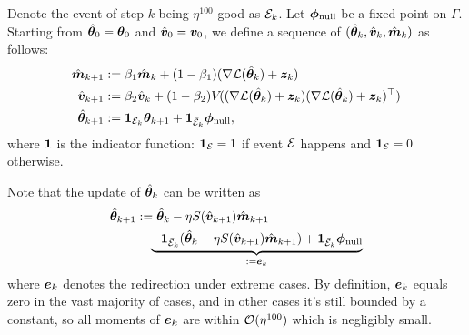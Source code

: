 \begin{definition}
    Denote the event of step $k$ being $\eta^{100}$-good as $\mathcal{E}_k$. Let ${\bm{\phi}}_{\mathrm{null}}$ be a fixed point on $\Gamma$. Starting from $\hat{{\bm{\theta}}}_0 = {\bm{\theta}}_0$ and $\hat{{\bm{v}}}_0 = {\bm{v}}_0$, we define a sequence of $(\hat{{\bm{\theta}}}_k,\hat{{\bm{v}}}_k, \hat{{\bm{m}}}_k)$ as follows: \begin{align*}
    \hat{{\bm{m}}}_{k+1} &:= \beta_1 \hat{{\bm{m}}}_{k} + (1-\beta_1) (\nabla\mathcal{L}(\hat{{\bm{\theta}}}_{k}) + {\bm{z}}_k ) \\
    \hat{{\bm{v}}}_{k+1} &:= \beta_2 \hat{{\bm{v}}}_{k} + (1-\beta_2) V\!((\nabla\mathcal{L}(\hat{{\bm{\theta}}}_{k}) + {\bm{z}}_k )(\nabla\mathcal{L}(\hat{{\bm{\theta}}}_{k}) + {\bm{z}}_k )^\top) \\
    \hat{{\bm{\theta}}}_{k+1} &:= \bm{1}_{\mathcal{E}_k}{\bm{\theta}}_{k+1} + \bm{1}_{\bar{\mathcal{E}}_k} {\bm{\phi}}_{\mathrm{null}}, 
    \end{align*}
    where $\bm{1}$ is the indicator function: $\bm{1}_{\mathcal{E}} = 1$ if event $\mathcal{E}$ happens and $\bm{1}_{\mathcal{E}}=0$ otherwise.
\end{definition}

Note that the update of $\hat{{\bm{\theta}}}_k$ can be written as \begin{align*}
    \hat{\vtheta}_{k+1} &:= \hat{\vtheta}_{k} - \eta S(\hat{\vv}_{k+1}) \hat{\vm}_{k+1} \\
    & \quad \underbrace{- \1_{\bar{\cE}_k}(\hat{\vtheta}_{k} - \eta S(\hat{\vv}_{k+1}) \hat{\vm}_{k+1} ) + \1_{\bar{\cE}_k}\vphi_{\mathrm{null}}}_{:=\ve_{k}}
\end{align*}
where $\ve_k$ denotes the redirection under extreme cases. By definition, $\ve_k$ equals zero in the vast majority of cases, and in other cases it's still bounded by a constant, so all moments of $\ve_k$ are within $\mathcal{O}(\eta^{100})$ which is negligibly small.
